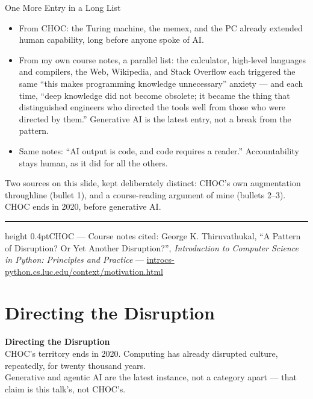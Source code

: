 \documentclass[10pt,aspectratio=1610]{beamer}
\newcommand{\lead}[1]{{\color{gktaccent2}#1}}
\newcommand{\chaptertag}[1]{%
  \vfill{\footnotesize\color{gktmuted}\hrule height 0.4pt\vspace{4pt}CHOC --- #1\par}%
}
\newcommand{\noteinline}[1]{{\footnotesize\color{gktmuted}#1\par}}
\begin{document}
\begin{frame}{One More Entry in a Long List}
\begin{itemize}
\item From CHOC: the Turing machine, the memex, and the PC already extended human capability, long before anyone spoke of AI.
\item From my own course notes, a parallel list: the calculator, high-level languages and compilers, the Web, Wikipedia, and Stack Overflow each triggered the same \enquote{this makes programming knowledge unnecessary} anxiety --- and each time, \enquote{deep knowledge did not become obsolete; it became the thing that distinguished engineers who directed the tools well from those who were directed by them.} Generative AI is the latest entry, not a break from the pattern.
\item Same notes: \enquote{AI output is code, and code requires a reader.} Accountability stays human, as it did for all the others.
\end{itemize}
\noteinline{Two sources on this slide, kept deliberately distinct: CHOC's own augmentation throughline (bullet 1), and a course-reading argument of mine (bullets 2--3). CHOC ends in 2020, before generative AI.}
\chaptertag{Course notes cited: George K. Thiruvathukal, \enquote{A Pattern of Disruption? Or Yet Another Disruption?}, \emph{Introduction to Computer Science in Python: Principles and Practice} --- \url{introcs-python.cs.luc.edu/context/motivation.html}}
\end{frame}

\section{Directing the Disruption}
\begin{frame}[plain]
\centering
{\Large\bfseries\color{gktaccent}Directing the Disruption}\\[1em]
\lead{\normalsize CHOC's territory ends in 2020. Computing has already disrupted culture, repeatedly, for twenty thousand years.}\\[1em]
{\normalsize Generative and agentic AI are the latest instance, not a category apart --- that claim is this talk's, not CHOC's.}
\end{frame}
\end{document}
